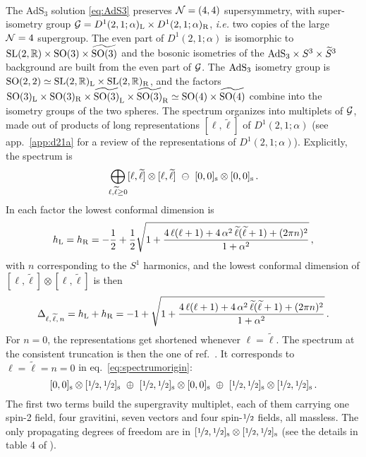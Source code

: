 \documentclass[a4paper, 11pt]{article}
\numberwithin{equation}{section}
\newcommand{\ts}[1]{\widetilde{#1}}
\newcommand{\+}{\oplus}
\begin{document}
\paragraph{}
The AdS$_3$ solution \eqref{eq:AdS3} preserves ${\cal N}=(4,4)$ supersymmetry, with super-isometry group ${\cal G}=D^{1}(2,1;\alpha)_{\rm L}\times D^{1}(2,1;\alpha)_{\rm R}$, \textit{i.e.} two copies of the large ${\cal N}=4$ supergroup. The even part of $D^{1}(2,1;\alpha)$ is isomorphic to ${\rm SL}(2,\mathbb{R})\times{\rm SO}(3)\times\ts{{\rm SO}(3)}$ and the bosonic isometries of the ${\rm AdS}_{3}\times S^{3}\times\ts{S}^{3}$ background are built from the even part of ${\cal G}$. The ${\rm AdS}_{3}$ isometry group is ${\rm SO}(2,2)\simeq{\rm SL}(2,\mathbb{R})_{\rm L}\times{\rm SL}(2,\mathbb{R})_{\rm R}$, and the factors ${\rm SO}(3)_{\rm L}\times{\rm SO}(3)_{\rm R}\times\ts{{\rm SO}(3)}_{\rm L}\times\ts{{\rm SO}(3)}_{\rm R}\simeq{\rm SO}(4)\times\ts{{\rm SO}(4)}$ combine into the isometry groups of the two spheres. The spectrum organizes into multiplets of ${\cal G}$, made out of products of long representations $[\ell,\ts{\ell}]$ of $D^{1}(2,1;\alpha)$ (see app.~\ref{app:d21a} for a review of the representations of $D^{1}(2,1;\alpha)$). Explicitly, the spectrum is~\cite{Eberhardt:2017fsi}
\begin{equation} \label{eq:spectrumorigin}
	\bigoplus_{\ell,\ts{\ell}\geq0} [\ell,\ts{\ell}]\otimes[\ell,\ts{\ell}] \ \ominus\ [0,0]_{\rm s} \otimes [0,0]_{\rm s}\,.
\end{equation}
In each factor the lowest conformal dimension is
\begin{equation}
	h_{\rm L} = h_{\rm R} = -\frac{1}{2} + \frac{1}{2}\sqrt{1+\frac{4\,\ell(\ell+1)+4\,\alpha^{2}\,\ts{\ell}(\ts{\ell}+1)+(2\pi n)^{2}}{1+\alpha^{2}}}\,,
\end{equation}
with $n$ corresponding to the $S^{1}$ harmonics, and the lowest conformal dimension of $[\ell,\ts{\ell}]\otimes[\ell,\ts{\ell}]$ is then
\begin{equation} \label{eq:confdims3s3s1}
	\Delta_{\ell,\,\ts{\ell},\,n} = h_{\rm L} + h_{\rm R} = - 1 + \sqrt{1+\frac{4\,\ell(\ell+1)+4\,\alpha^{2}\,\ts{\ell}(\ts{\ell}+1)+(2\pi n)^{2}}{1+\alpha^{2}}}\,.
\end{equation}
For $n=0$, the representations get shortened whenever $\ell = \ts{\ell}$. The spectrum at the consistent truncation is then the one of ref.~\cite{Hohm:2005ui}. It corresponds to $\ell=\ts{\ell}=n=0$ in eq.~\eqref{eq:spectrumorigin}:
\begin{equation} \label{eq:CTmultorigin}
	[0,0]_{\rm s} \otimes [\nicefrac{1}{2},\nicefrac{1}{2}]_{\rm s} \ \oplus \ [\nicefrac{1}{2},\nicefrac{1}{2}]_{\rm s} \otimes [0,0]_{\rm s} \ \oplus \ [\nicefrac{1}{2},\nicefrac{1}{2}]_{\rm s} \otimes [\nicefrac{1}{2},\nicefrac{1}{2}]_{\rm s}\,.
\end{equation}
The first two terms build the supergravity multiplet, each of them carrying one spin-2 field, four gravitini, seven vectors and four spin-$\nicefrac{1}{2}$ fields, all massless. The only propagating degrees of freedom are in $[\nicefrac{1}{2},\nicefrac{1}{2}]_{\rm s}\otimes[\nicefrac{1}{2},\nicefrac{1}{2}]_{\rm s}$ (see the details in table 4 of \cite{Hohm:2005ui}).
\end{document}
